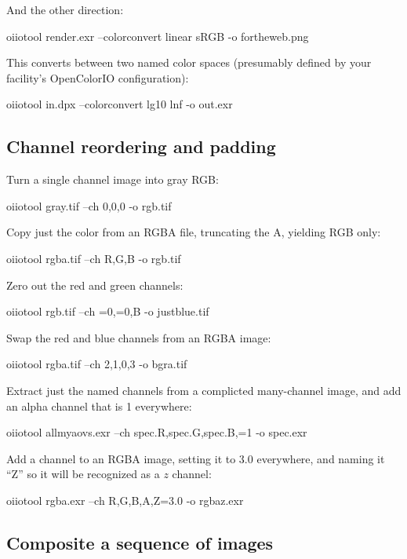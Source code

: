 \noindent And the other direction:

\begin{code}
    oiiotool render.exr --colorconvert linear sRGB -o fortheweb.png
\end{code}

\noindent This converts between two named color spaces (presumably
defined by your facility's OpenColorIO configuration):

\begin{code}
    oiiotool in.dpx --colorconvert lg10 lnf -o out.exr
\end{code}


\subsection*{Channel reordering and padding}

\noindent Turn a single channel image into gray RGB:
\begin{code}
    oiiotool gray.tif --ch 0,0,0 -o rgb.tif
\end{code}

\noindent Copy just the color from an RGBA file, truncating the A,
yielding RGB only:
\begin{code}
    oiiotool rgba.tif --ch R,G,B -o rgb.tif
\end{code}

\noindent Zero out the red and green channels:
\begin{code}
    oiiotool rgb.tif --ch =0,=0,B -o justblue.tif
\end{code}

\noindent Swap the red and blue channels from an RGBA image:
\begin{code}
    oiiotool rgba.tif --ch 2,1,0,3 -o bgra.tif
\end{code}

\noindent Extract just the named channels from a complicted many-channel
image, and add an alpha channel that is 1 everywhere:
\begin{code}
    oiiotool allmyaovs.exr --ch spec.R,spec.G,spec.B,=1 -o spec.exr
\end{code}

\noindent Add a channel to an RGBA image, setting it to 3.0 everywhere,
and naming it ``Z'' so it will be recognized as a $z$ channel:
\begin{code}
    oiiotool rgba.exr --ch R,G,B,A,Z=3.0 -o rgbaz.exr
\end{code}


\subsection*{Composite a sequence of images}

